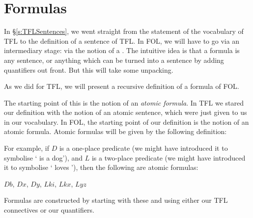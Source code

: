 \section{Formulas}
In \S\ref{s:TFLSentences}, we went straight from the statement of the vocabulary of TFL to the definition of a sentence of TFL. In FOL, we will have to go via an intermediary stage: via the notion of a . The intuitive idea is that a formula is any sentence, or anything which can be turned into a sentence by adding quantifiers out front. But this will take some unpacking.

As we did for TFL, we will  present a recursive definition of a formula of FOL.

The starting point of this is the notion of an \emph{atomic formula}. In TFL we stared our definition with the notion of an atomic sentence, which were just given to us in our vocabulary. In FOL, the starting point of our definition is the notion of an atomic formula. Atomic formulas will be given by the following definition:

For example, if $D$ is a one-place predicate (we might have introduced it to symbolise ` is a dog'), and $L$ is a two-place predicate (we might have introduced it to symbolise ` loves '), then the following are atomic formulas:
\begin{center}
 $Db$,
 $Dx$,
 $Dy$,
 $Lki$,
 $Lkx$,
 $Lyz$
\end{center}

Formulas are constructed by starting with these and using either our TFL connectives or our quantifiers.

